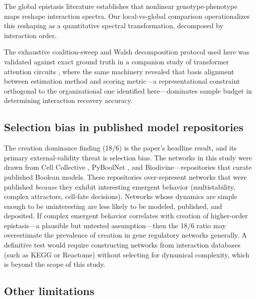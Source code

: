 \documentclass[10pt]{article}
\begin{document}
The global epistasis literature \citep{otwinowski2018inferring, reddy2021global} establishes that nonlinear genotype-phenotype maps
reshape interaction spectra. Our local-vs-global comparison
operationalizes this reshaping as a quantitative spectral
transformation, decomposed by interaction order.

The exhaustive coalition-sweep and Walsh decomposition protocol used
here was validated against exact ground truth in a companion study
of transformer attention circuits \citep{tower2026epistasis}, where the same machinery revealed that basis alignment
between estimation method and scoring metric---a representational
constraint orthogonal to the organizational one identified
here---dominates sample budget in determining interaction recovery
accuracy.


\subsection{Selection bias in published model repositories}

The creation dominance finding (18/6) is the paper's headline result,
and its primary external-validity threat is selection bias.
The networks in this study were drawn from Cell Collective
\citep{helikar2012cell}, PyBoolNet \citep{klarner2017pyboolnet}, and
Biodivine---repositories that curate published Boolean models. These
repositories over-represent networks that were published \emph{because}
they exhibit interesting emergent behavior (multistability, complex
attractors, cell-fate decisions). Networks whose dynamics are simple
enough to be uninteresting are less likely to be modeled, published,
and deposited. If complex emergent behavior correlates with creation
of higher-order epistasis---a plausible but untested assumption---then
the 18/6 ratio may overestimate the prevalence of creation in gene
regulatory networks generally. A definitive test would require
constructing networks from interaction databases (such as KEGG or
Reactome) without selecting for dynamical complexity, which is beyond
the scope of this study.

\subsection{Other limitations}
\end{document}
